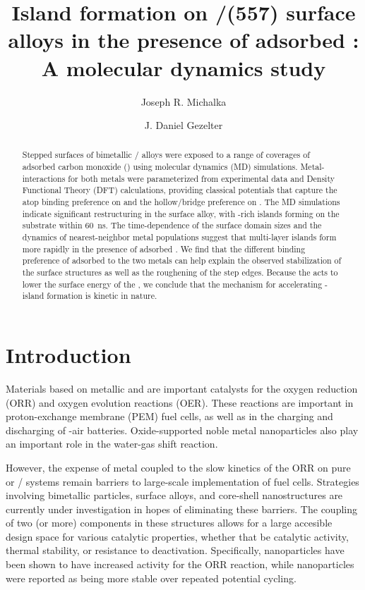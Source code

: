 \documentclass[journal = jpccck, manuscript = article]{achemso}
\title{Island formation on \ce{Pt}/\ce{Pd}(557) surface alloys in the
  presence of adsorbed \ce{CO}: A molecular dynamics study}
\author{Joseph R. Michalka}
\author{J. Daniel Gezelter}
\affiliation[University of Notre Dame]{251 Nieuwland Science Hall\\
  Department of Chemistry and Biochemistry\\ University of Notre
  Dame\\ Notre Dame, Indiana 46556}
\begin{document}


\begin{abstract}
  Stepped surfaces of bimetallic / alloys were exposed
  to a range of coverages of adsorbed carbon monoxide () using
  molecular dynamics (MD) simulations. Metal- interactions for
  both metals were parameterized from experimental data and Density
  Functional Theory (DFT) calculations, providing classical potentials
  that capture the atop binding preference on  and the
  hollow/bridge preference on .  The MD simulations indicate
  significant restructuring in the surface alloy, with -rich
  islands forming on the  substrate within 60~ns.  The
  time-dependence of the surface domain sizes and the dynamics of
  nearest-neighbor metal populations suggest that multi-layer 
  islands form more rapidly in the presence of adsorbed .  We
  find that the different binding preference of  adsorbed to
  the two metals can help explain the observed stabilization of the
   surface structures as well as the roughening of the 
  step edges.  Because the  acts to lower the surface energy of
  the , we conclude that the mechanism for accelerating
  -island formation is kinetic in nature.
\end{abstract}

\newpage

\section{Introduction}

Materials based on metallic  and  are important
catalysts for the oxygen reduction
(ORR)\cite{Lim:2009fk,Liu:2012bs,Limpattayanate:2014ij} and oxygen
evolution reactions (OER).\cite{Stamenkovic:2007kk,Reier:2012uq} These
reactions are important in proton-exchange membrane (PEM) fuel
cells,\cite{Bliznakov:2012kx,Shao:2013rm} as well as in the charging
and discharging of -air batteries.\cite{Lu:2011vn}
Oxide-supported noble metal nanoparticles also play an important role in
the water-gas shift reaction.\cite{Bunluesin:1998ys,Kugai:2011rt}

However, the expense of  metal coupled to the slow kinetics of
the ORR on pure  or / systems remain barriers to
large-scale implementation of fuel cells. Strategies involving
bimetallic particles, surface alloys, and core-shell nanostructures
are currently under investigation in hopes of eliminating these
barriers.\cite{Gao:2009oj,Gao:2009wo,Kim:2013jt} The coupling of two
(or more) components in these structures allows for a large accesible
design space for various catalytic properties, whether that be
catalytic activity,\cite{Kim:2013jt,Sneed:2014fj,Gu:2015cr} thermal
stability,\cite{Cao:2010gf,Yang:0pd,Huang:2012ul} or resistance to
deactivation.\cite{Yu:2013fr,Zhang:2015yq} Specifically,
 nanoparticles have been shown to have increased
activity for the ORR reaction,\cite{Lim:2009fk,Liu:2012bs,Shao:2013rm}
while  nanoparticles were reported as being more
stable over repeated potential cycling.\cite{Zhang:2007lq}
\end{document}
